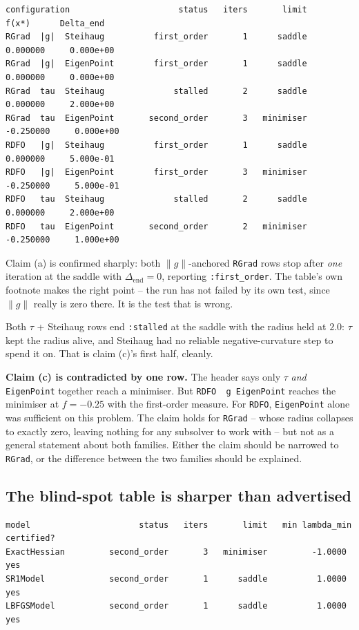 \documentclass[11pt,a4paper]{article}
\newcommand{\jl}[1]{\texttt{\small #1}}
\newcommand{\finding}[1]{\textcolor{Alert}{\textbf{#1}}}
\newcommand{\gnorm}{\lVert g\rVert}
\begin{document}
\begin{lstlisting}
configuration                      status   iters       limit        f(x*)      Delta_end
RGrad  |g|  Steihaug          first_order       1      saddle     0.000000     0.000e+00
RGrad  |g|  EigenPoint        first_order       1      saddle     0.000000     0.000e+00
RGrad  tau  Steihaug              stalled       2      saddle     0.000000     2.000e+00
RGrad  tau  EigenPoint       second_order       3   minimiser    -0.250000     0.000e+00
RDFO   |g|  Steihaug          first_order       1      saddle     0.000000     5.000e-01
RDFO   |g|  EigenPoint        first_order       3   minimiser    -0.250000     5.000e-01
RDFO   tau  Steihaug              stalled       2      saddle     0.000000     2.000e+00
RDFO   tau  EigenPoint       second_order       2   minimiser    -0.250000     1.000e+00
\end{lstlisting}

Claim (a) is confirmed sharply: both $\gnorm$-anchored \jl{RGrad} rows stop after
\emph{one} iteration at the saddle with $\Delta_{\text{end}} = 0$, reporting
\jl{:first\_order}. The table's own footnote makes the right point -- the run has
not failed by its own test, since $\gnorm$ really is zero there. It is the test
that is wrong.

Both $\tau$ + Steihaug rows end \jl{:stalled} at the saddle with the radius held at
$2.0$: $\tau$ kept the radius alive, and Steihaug had no reliable negative-curvature
step to spend it on. That is claim (c)'s first half, cleanly.

\finding{Claim (c) is contradicted by one row.} The header says only $\tau$
\emph{and} \jl{EigenPoint} together reach a minimiser. But
\jl{RDFO \ \textbar g\textbar \ EigenPoint} reaches the minimiser at $f = -0.25$
with the first-order measure. For \jl{RDFO}, \jl{EigenPoint} alone was sufficient
on this problem. The claim holds for \jl{RGrad} -- whose radius collapses to
exactly zero, leaving nothing for any subsolver to work with -- but not as a
general statement about both families. Either the claim should be narrowed to
\jl{RGrad}, or the difference between the two families should be explained.

\subsection{The blind-spot table is sharper than advertised}

\begin{lstlisting}
model                      status   iters       limit   min lambda_min   certified?
ExactHessian         second_order       3   minimiser         -1.0000          yes
SR1Model             second_order       1      saddle          1.0000          yes
LBFGSModel           second_order       1      saddle          1.0000          yes
\end{lstlisting}
\end{document}
